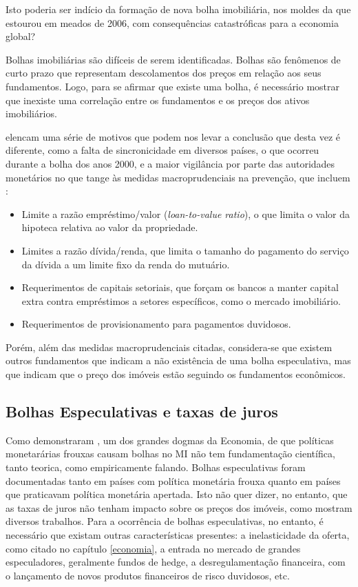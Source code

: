\documentclass[
	12pt,				%
	oneside,			%
	a4paper,			%
	chapter=TITLE,		%
	section=TITLE,		%
	english,			%
	brazil				%
	]{abntex2}
\begin{document}
Isto poderia ser indício da formação de nova bolha imobiliária, nos moldes da
que estourou em meados de 2006, com consequências catastróficas para a economia
global?

Bolhas imobiliárias são difíceis de serem identificadas. Bolhas são fenômenos
de curto prazo que representam descolamentos dos preços em relação aos seus
fundamentos. Logo, para se afirmar que existe uma bolha, é necessário mostrar
que inexiste uma correlação entre os fundamentos e os preços dos ativos
imobiliários.

\textcite{fmitwa} elencam uma série de motivos que podem nos levar a conclusão que desta
vez é diferente, como a falta de sincronicidade em diversos países, o que
ocorreu durante a bolha dos anos 2000, e a maior vigilância por parte das
autoridades monetários no que tange às medidas macroprudenciais na prevenção,
que incluem \autocite{fmiem}:
\begin{itemize}
\tightlist
\item
  Limite a razão empréstimo/valor (\emph{loan-to-value ratio}), o que limita o valor
  da hipoteca relativa ao valor da propriedade.
\item
  Limites a razão dívida/renda, que limita o tamanho do pagamento do serviço da
  dívida a um limite fixo da renda do mutuário.
\item
  Requerimentos de capitais setoriais, que forçam os bancos a manter capital
  extra contra empréstimos a setores específicos, como o mercado imobiliário.
\item
  Requerimentos de provisionamento para pagamentos duvidosos.
\end{itemize}
Porém, além das medidas macroprudenciais citadas, considera-se que existem
outros fundamentos que indicam a não existência de uma bolha especulativa, mas
que indicam que o preço dos imóveis estão seguindo os fundamentos econômicos.

\hypertarget{bolhas-especulativas-e-taxas-de-juros}{%
\subsection{Bolhas Especulativas e taxas de juros}\label{bolhas-especulativas-e-taxas-de-juros}}

Como demonstraram \textcite{joebges}, um dos grandes dogmas da Economia, de que políticas
monetarárias frouxas causam bolhas no \gls{MI} não tem fundamentação científica,
tanto teorica, como empiricamente falando. Bolhas especulativas foram
documentadas tanto em países com política monetária frouxa quanto em países que
praticavam política monetária apertada. Isto não quer dizer, no entanto, que
as taxas de juros não tenham impacto sobre os preços dos imóveis, como mostram
diversos trabalhos. Para a ocorrência de bolhas especulativas, no entanto, é
necessário que existam outras características presentes: a inelasticidade da
oferta, como citado no capítulo \ref{economia}, a entrada no mercado de
grandes especuladores, geralmente fundos de hedge, a desregulamentação
financeira, com o lançamento de novos produtos financeiros de risco duvidosos,
etc.
\end{document}
